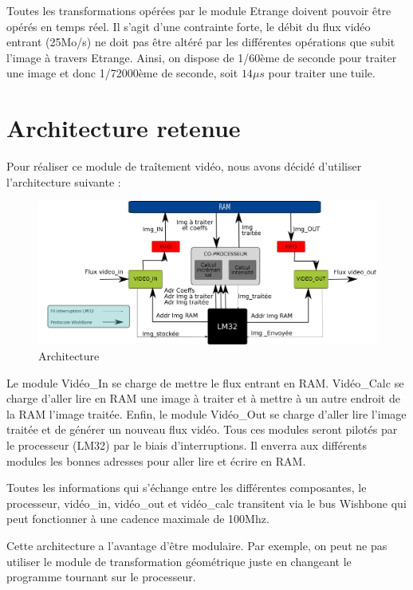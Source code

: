 {{Toutes les transformations opérées par le module Etrange doivent pouvoir être opérés en temps réel. Il s'agit d'une contrainte forte, le débit du flux vidéo entrant (25Mo/s) ne doit pas être altéré par les différentes opérations que subit l'image à travers Etrange.
Ainsi, on dispose de 1/60ème de seconde pour traiter une image et donc 1/72000ème de seconde, soit $14 \mu s$ pour traiter une tuile.

	\section{Architecture retenue}
{Pour réaliser ce module de traîtement vidéo, nous avons décidé d'utiliser l'architecture suivante :
 
\begin{figure}[!h]
	\centering
	\includegraphics[scale = 0.1]{hardware-arch.png}
	\caption{Architecture}
\end{figure}

Le module Vidéo\_In se charge de mettre le flux entrant en RAM. Vidéo\_Calc se charge d'aller lire en RAM une image à traiter et à mettre à un autre endroit de la RAM l'image traitée. Enfin, le module Vidéo\_Out se charge d'aller lire l'image traitée et de générer un nouveau flux vidéo. Tous ces modules seront pilotés par le processeur (LM32) par le biais d'interruptions. Il enverra aux différents modules les bonnes adresses pour aller lire et écrire en RAM.

Toutes les informations qui s'échange entre les différentes composantes, le processeur, vidéo\_in, vidéo\_out et vidéo\_calc transitent via le bus Wishbone qui peut fonctionner à une cadence maximale de 100Mhz. 

Cette architecture a l'avantage d'être modulaire. Par exemple, on peut ne pas utiliser le module de transformation géométrique juste en changeant le programme tournant sur le processeur.
}



}}
